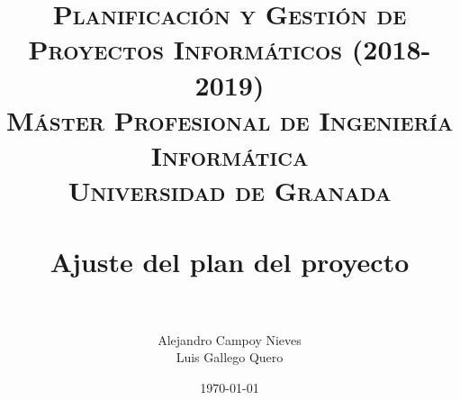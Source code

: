 

\title{	
	\normalfont \normalsize 
	\textsc{\textbf{Planificación y Gestión de Proyectos Informáticos (2018-2019)} \\ Máster Profesional de Ingeniería Informática \\ Universidad de Granada} \\ [25pt] %
	\horrule{0.5pt} \\[0.4cm] %
	\huge Ajuste del plan del proyecto \\ %
	\horrule{2pt} \\[0.5cm] %
}

\author{Alejandro Campoy Nieves \\ Luis Gallego Quero} %
\date{\normalsize\today} %

\usepackage[spanish, es-tabla]{babel}
\usepackage{hyperref} %
\hypersetup{
	colorlinks=true,
	linkcolor=blue,
	filecolor=magenta,      
	urlcolor=cyan,
}
\usepackage{graphicx}
\usepackage{amssymb, amsmath, amsbsy}
\usepackage{mathptmx}	
\usepackage{float}
\usepackage{booktabs}					%
\usepackage{eurosym}
\usepackage{xcolor}
\usepackage{colortbl}




	\maketitle %
	
	\newpage %
	
	\tableofcontents %
	
	\listoffigures
	
	\listoftables	
	
	\newpage	
 
